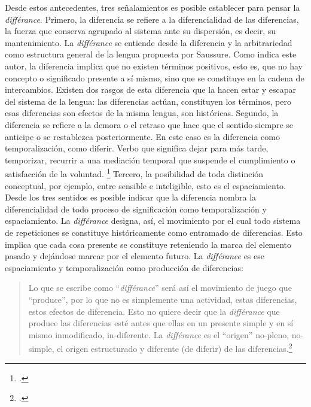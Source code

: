 Desde estos antecedentes, tres señalamientos es posible establecer para pensar la \emph{différance}. Primero, la diferencia se refiere a la diferencialidad de las diferencias, la fuerza que conserva agrupado al sistema ante su dispersión, es decir, su mantenimiento. La \emph{différance} se entiende desde la diferencia y la arbitrariedad como estructura general de la lengua propuesta por Saussure. Como indica este autor, la diferencia implica que no existen términos positivos, esto es, que no hay concepto o significado presente a sí mismo, sino que se constituye en la cadena de intercambios. Existen dos rasgos de esta diferencia que la hacen estar y escapar del sistema de la lengua: las diferencias actúan, constituyen los términos, pero esas diferencias son efectos de la misma lengua, son históricas. Segundo, la diferencia se refiere a la demora o el retraso que hace que el sentido siempre se anticipe o se restablezca posteriormente. En este caso es la diferencia como temporalización, como diferir. Verbo que significa dejar para más tarde, temporizar, recurrir a una mediación temporal que suspende el cumplimiento o satisfacción de la voluntad. \footcite[Por lo que se juega aquí también una comprensión de la temporalidad: \enquote{Estos conceptos de \emph{différance}} y de retardo originarios son impensables bajo la autoridad de la lógica de la identidad o incluso bajo el concepto de tiempo. El absurdo mismo que se señala así \emph{en los términos} permite pensar, con tal que esté organizado de una cierta manera, el más allá de esta lógica y de este concepto. Bajo la palabra \emph{retardo}, hay que pensar otra cosa que una relación entre dos \enquote{presentes}; hay que evitar la representación siguiente: sólo ocurre en un presente B lo que debía (habría debido) producirse en un presente A (\enquote{anterior}).][280]{@6982-DERRIDA1989}  Tercero, la posibilidad de toda distinción conceptual, por ejemplo, entre sensible e inteligible, esto es el espaciamiento. Desde los tres sentidos es posible indicar que la diferencia nombra la diferencialidad de todo proceso de significación como temporalización y espaciamiento. La \emph{différance} designa, así, el movimiento por el cual todo sistema de repeticiones se constituye históricamente como entramado de diferencias. Esto implica que cada cosa presente se constituye reteniendo la marca del elemento pasado y dejándose marcar por el elemento futuro. La \emph{différance} es ese espaciamiento y temporalización como producción de diferencias:

\begin{quote}
Lo que se escribe como \enquote{\emph{différance}} será así el movimiento de juego que \enquote{produce}, por lo que no es simplemente una actividad, estas diferencias, estos efectos de diferencia. Esto no quiere decir que la \emph{différance} que produce las diferencias esté antes que ellas en un presente simple y en sí mismo inmodificado, in-diferente. La \emph{différance} es el \enquote{origen} no-pleno, no-simple, el origen estructurado y diferente (de diferir) de las diferencias.\footcite[12]{@6980-DERRIDA1989}
\end{quote}

